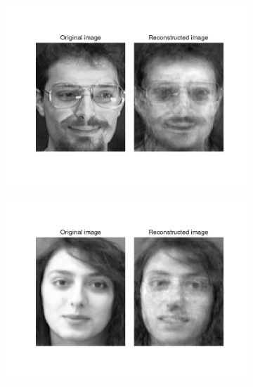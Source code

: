 \begin{homeworkProblem}
\begin{figure}[H]
\begin{subfigure}{0.5\textwidth}
      \includegraphics[width=1.\linewidth]{./images/encoded_3.png}
    \end{subfigure}%
    \begin{subfigure}{0.5\textwidth}
      \centering
      \includegraphics[width=1.\linewidth]{./images/encoded_4.png}
    \end{subfigure}
    \begin{subfigure}{0.5\textwidth}
      \centering

\end{subfigure}
\end{figure}
\end{homeworkProblem}
